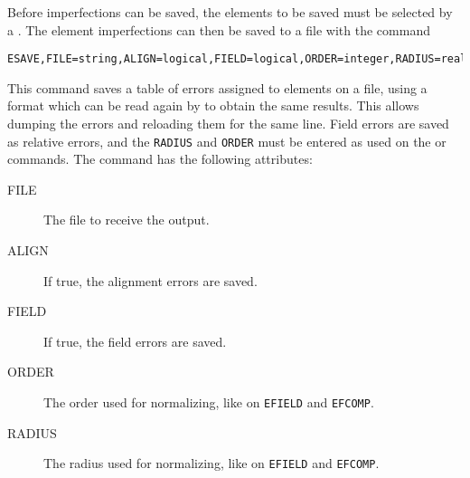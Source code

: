 Before imperfections can be saved, 
the elements to be saved must be selected by a
.
The element imperfections can then be saved to a file with the command
\begin{verbatim}
ESAVE,FILE=string,ALIGN=logical,FIELD=logical,ORDER=integer,RADIUS=real;
\end{verbatim}
This command saves a table of errors assigned to elements on a file,
using a format which can be read again by \opal to obtain the same results.
This allows dumping the errors and reloading them for the same line.
Field errors are saved as relative errors,
and the \texttt{RADIUS} and \texttt{ORDER} must be entered as used on the
 or 
 commands.
The command has the following attributes:
\begin{description}
\item[FILE]
  The file to receive the output.
\item[ALIGN]
  If true, the alignment errors are saved.
\item[FIELD]
  If true, the field errors are saved.
\item[ORDER]
  The order used for normalizing, like on \texttt{EFIELD} and
  \texttt{EFCOMP}. 
\item[RADIUS]
  The radius used for normalizing, like on \texttt{EFIELD} and
  \texttt{EFCOMP}.
\end{description}

